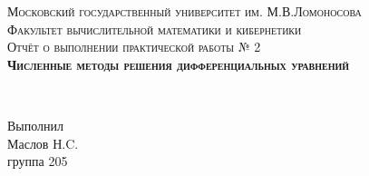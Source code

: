 \begin{titlepage}




\center %
 

\textsc{\Large Московский государственный университет им. М.В.Ломоносова}\\[0.5cm] %
\textsc{\Large Факультет вычислительной математики и кибернетики}\\[7.5cm] %


\textsc{\LARGE Отчёт о выполнении практической работы № 2}\\[1cm]
\textsc{\LARGE \huge \bfseries Численные методы решения дифференциальных уравнений}\\[5cm] %
 

\begin{minipage}{0.4\textwidth}
\begin{flushleft} \large

\end{flushleft}
\end{minipage}
~
\begin{minipage}{0.4\textwidth}
\begin{flushright} \large
Выполнил \\[0.3cm]
Маслов Н.C. \\ группа 205 %
\end{flushright}
\end{minipage}\\[4cm]



\end{titlepage}
